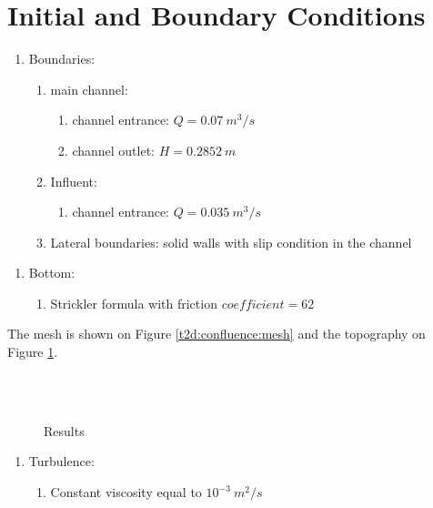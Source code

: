 \section{Initial and Boundary Conditions}
%
\begin{enumerate}
    \item[] Boundaries:
    \begin{enumerate}
        \item[\textendash] main channel:
        \begin{enumerate}
            \item[\textbullet] channel entrance: $Q = 0.07~m^3/s$
            \item[\textbullet] channel outlet: $H = 0.2852~m$
        \end{enumerate}
        \item[\textendash] Influent:
        \begin{enumerate}
            \item[\textbullet] channel entrance: $Q = 0.035~m^3/s$
        \end{enumerate}
    \item[\textendash] Lateral boundaries: solid walls with slip condition in
    the channel
    \end{enumerate}
\end{enumerate}
%
\begin{enumerate}
  \item[] Bottom:
  \begin{enumerate}
      \item[\textendash] Strickler formula with friction $coefficient = 62$
  \end{enumerate}
\end{enumerate}
The mesh is shown on Figure  \ref{t2d:confluence:mesh} and the topography on
Figure  \ref{t2d:confluence:results}.
%
\begin{figure}[H]
  \centering
  \\
  \\
  \caption{Results}\label{t2d:confluence:results}
\end{figure}
%
\begin{enumerate}
  \item[] Turbulence:
  \begin{enumerate}
      \item[\textendash] Constant viscosity equal to $10^{-3}~m^2/s$
  \end{enumerate}
\end{enumerate}
%
%
%
